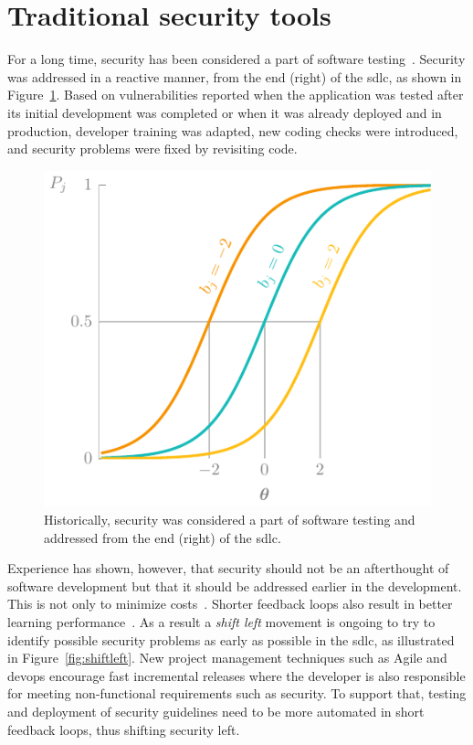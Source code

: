 \section{Traditional security tools}
\label{sec:traditionalsecurity}

For a long time, security has been considered a part of software testing~\cite{sharma2017}.
Security was addressed in a reactive manner, from the end (right) of the \gls{sdlc}, as shown in Figure~\ref{fig:testing}.
Based on vulnerabilities reported when the application was tested after its initial development was completed or when it was already deployed and in production, developer training was adapted, new coding checks were introduced, and \glspl{security problem} were fixed by revisiting code.

\begin{figure}
    \centering
    \includegraphics[page=16]{03-education/figures/tikzfigures.pdf}
  \caption[Security as part of software testing]{Historically, security was considered a part of software testing and addressed from the end (right) of the \gls{sdlc}.}
  \label{fig:testing} 
\end{figure}

Experience has shown, however, that security should not be an afterthought of software development but that it should be addressed earlier in the development. This is not only to minimize costs~\cite{damm2006faults,briand2000comprehensive,baca2008evaluating,layman2007toward}. Shorter feedback loops also result in better learning performance~\cite{syed2015black,whitney2018embedding}. As a result a \emph{shift left} movement is ongoing to try to identify possible \glspl{security problem} as early as possible in the \gls{sdlc}, as illustrated in Figure~\ref{fig:shiftleft}. New project management techniques such as Agile and \gls{devops} encourage fast incremental releases where the developer is also responsible for meeting non-functional requirements such as security. To support that, testing and deployment of security guidelines need to be more automated in short feedback loops, thus shifting security left.

